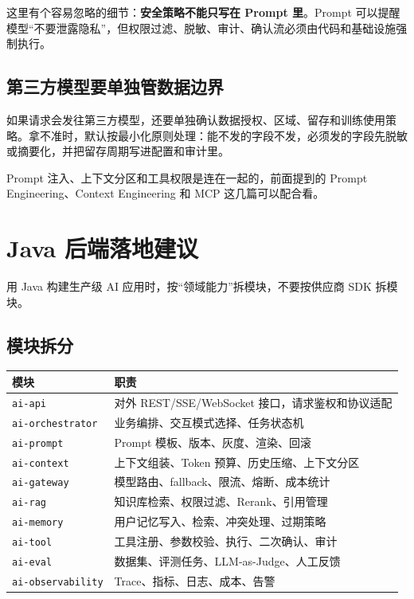 \documentclass[9pt,a4paper,twocolumn]{ctexart}
\begin{document}
这里有个容易忽略的细节：\textbf{安全策略不能只写在 Prompt 里}。Prompt 可以提醒模型“不要泄露隐私”，但权限过滤、脱敏、审计、确认流必须由代码和基础设施强制执行。



\subsection*{第三方模型要单独管数据边界}


如果请求会发往第三方模型，还要单独确认数据授权、区域、留存和训练使用策略。拿不准时，默认按最小化原则处理：能不发的字段不发，必须发的字段先脱敏或摘要化，并把留存周期写进配置和审计里。



Prompt 注入、上下文分区和工具权限是连在一起的，前面提到的 Prompt Engineering、Context Engineering 和 MCP 这几篇可以配合看。



\section*{Java 后端落地建议}


用 Java 构建生产级 AI 应用时，按“领域能力”拆模块，不要按供应商 SDK 拆模块。



\subsection*{模块拆分}

{\footnotesize
\begin{tabular}{|p{}|p{}|}
\hline
\textbf{模块} & \textbf{职责} \\
\hline
\texttt{ai-api} & 对外 REST/SSE/WebSocket 接口，请求鉴权和协议适配 \\
\hline
\texttt{ai-orchestrator} & 业务编排、交互模式选择、任务状态机 \\
\hline
\texttt{ai-prompt} & Prompt 模板、版本、灰度、渲染、回滚 \\
\hline
\texttt{ai-context} & 上下文组装、Token 预算、历史压缩、上下文分区 \\
\hline
\texttt{ai-gateway} & 模型路由、fallback、限流、熔断、成本统计 \\
\hline
\texttt{ai-rag} & 知识库检索、权限过滤、Rerank、引用管理 \\
\hline
\texttt{ai-memory} & 用户记忆写入、检索、冲突处理、过期策略 \\
\hline
\texttt{ai-tool} & 工具注册、参数校验、执行、二次确认、审计 \\
\hline
\texttt{ai-eval} & 数据集、评测任务、LLM-as-Judge、人工反馈 \\
\hline
\texttt{ai-observability} & Trace、指标、日志、成本、告警 \\
\hline
\end{tabular}
}
\end{document}
